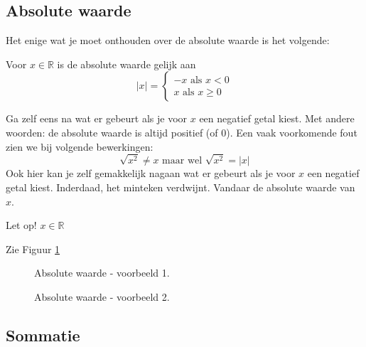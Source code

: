 \subsection{Absolute waarde}
Het enige wat je moet onthouden over de absolute waarde is het volgende:

\begin{definitie}
	Voor $x \in \mathbb{R}$ is de absolute waarde gelijk aan 
	\begin{equation*}
	|x| = \begin{cases}
	-x \text{ als } x<0 \\
	x \text{ als } x\ge 0 
	\end{cases}
	\end{equation*}
\end{definitie}

Ga zelf eens na wat er gebeurt als je voor $x$ een negatief getal kiest.
Met andere woorden: de absolute waarde is altijd positief (of 0).
Een vaak voorkomende fout zien we bij volgende bewerkingen:
\begin{equation*}
\sqrt{x^2}\ne x \text{ maar wel } \sqrt{x^2}=|x|
\end{equation*}
Ook hier kan je zelf gemakkelijk nagaan wat er gebeurt als je voor $x$ een negatief getal kiest. Inderdaad, het minteken verdwijnt. Vandaar de absolute waarde van $x$.

\begin{opmerking}
Let op! $x \in \mathbb{R}$	
\end{opmerking}

\begin{voorbeeld}
Zie Figuur \ref{fig:absvalue}

\begin{figure}[H]
	\centering	
	
	\caption{Absolute waarde - voorbeeld 1.}
	\label{fig:absvalue}
\end{figure}

\end{voorbeeld}

\begin{voorbeeld}
	
\begin{figure}[H]
	\centering	
		
	\caption{Absolute waarde - voorbeeld 2.}
	\label{fig:absvalue2}
\end{figure}	

\end{voorbeeld}

\subsection{Sommatie}

